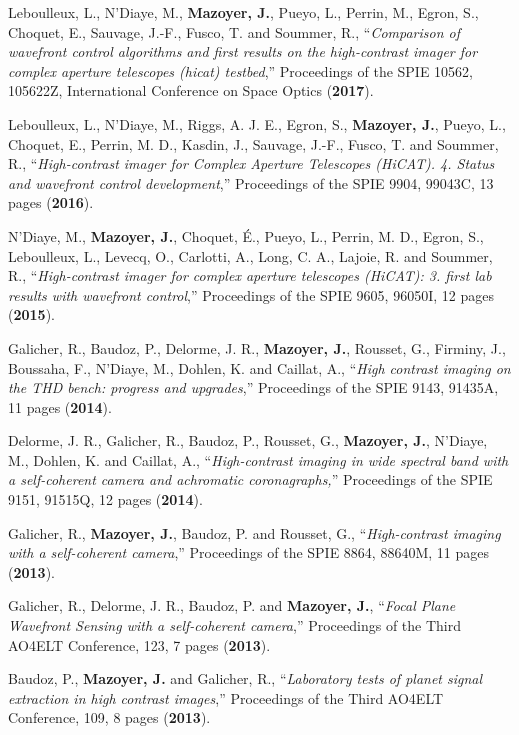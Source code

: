 \documentclass[11pt,a4paper, french]{article}
\begin{document}
\begin{etaremune}
\item Leboulleux, L., N’Diaye, M., \textbf{Mazoyer, J.}, Pueyo, L., Perrin, M., Egron, S., Choquet, E., Sauvage, J.-F., Fusco, T. and Soummer, R., “\textit{Comparison of wavefront control algorithms and first results on the high-contrast imager for complex aperture telescopes (hicat) testbed},” Proceedings of the SPIE 10562, 105622Z, International Conference on Space Optics (\textbf{2017}).
\item Leboulleux, L., N’Diaye, M., Riggs, A. J. E., Egron, S., \textbf{Mazoyer, J.}, Pueyo, L., Choquet, E., Perrin, M. D., Kasdin, J., Sauvage, J.-F., Fusco, T. and Soummer, R., “\textit{High-contrast imager for Complex Aperture Telescopes (HiCAT). 4. Status and wavefront control development},” Proceedings of the SPIE 9904, 99043C, 13 pages (\textbf{2016}).
\item N’Diaye, M., \textbf{Mazoyer, J.}, Choquet, É., Pueyo, L., Perrin, M. D., Egron, S., Leboulleux, L., Levecq, O., Carlotti, A., Long, C. A., Lajoie, R. and Soummer, R., “\textit{High-contrast imager for complex aperture telescopes (HiCAT): 3. first lab results with wavefront control},” Proceedings of the SPIE 9605, 96050I, 12 pages (\textbf{2015}).
\item Galicher, R., Baudoz, P., Delorme, J. R., \textbf{Mazoyer, J.}, Rousset, G., Firminy, J., Boussaha, F., N’Diaye, M., Dohlen, K. and Caillat, A., “\textit{High contrast imaging on the THD bench: progress and upgrades},” Proceedings of the SPIE 9143, 91435A, 11 pages (\textbf{2014}).
\item Delorme, J. R., Galicher, R., Baudoz, P., Rousset, G., \textbf{Mazoyer, J.}, N’Diaye, M., Dohlen, K. and Caillat, A., “\textit{High-contrast imaging in wide spectral band with a self-coherent camera and achromatic coronagraphs,}” Proceedings of the SPIE 9151, 91515Q, 12 pages (\textbf{2014}).
\item Galicher, R., \textbf{Mazoyer, J.}, Baudoz, P. and Rousset, G., “\textit{High-contrast imaging with a self-coherent camera},” Proceedings of the SPIE 8864, 88640M, 11 pages (\textbf{2013}).
\item Galicher, R., Delorme, J. R., Baudoz, P. and \textbf{Mazoyer, J.}, “\textit{Focal Plane Wavefront Sensing with a self-coherent camera},” Proceedings of the Third AO4ELT Conference, 123, 7 pages (\textbf{2013}).
\item Baudoz, P., \textbf{Mazoyer, J.} and Galicher, R., “\textit{Laboratory tests of planet signal extraction in high contrast images},” Proceedings of the Third AO4ELT Conference, 109, 8 pages (\textbf{2013}).

\end{etaremune}
\end{document}
